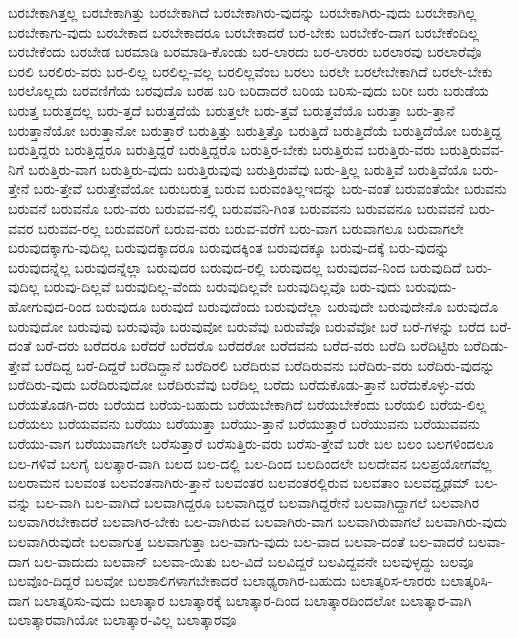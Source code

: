 {ಬರಬೇಕಾಗಿತ್ತಲ್ಲ
ಬರಬೇಕಾಗಿತ್ತು
ಬರಬೇಕಾಗಿದೆ
ಬರಬೇಕಾಗಿರು-ವುದನ್ನು
ಬರಬೇಕಾಗಿರು-ವುದು
ಬರಬೇಕಾಗಿಲ್ಲ
ಬರಬೇಕಾಗು-ವುದು
ಬರಬೇಕಾದ
ಬರಬೇಕಾದರೂ
ಬರಬೇಕಾದರೆ
ಬರ-ಬೇಕು
ಬರಬೇಕೆಂ-ದಾಗ
ಬರಬೇಕೆಂದಿಲ್ಲ
ಬರಬೇಕೆಂದು
ಬರಬೇಡ
ಬರಮಾಡಿ
ಬರಮಾಡಿ-ಕೊಂಡು
ಬರ-ಲಾರದು
ಬರ-ಲಾರರು
ಬರಲಾರವು
ಬರಲಾರೆವೊ
ಬರಲಿ
ಬರಲಿರು-ವರು
ಬರ-ಲಿಲ್ಲ
ಬರಲಿಲ್ಲ-ವಲ್ಲ
ಬರಲಿಲ್ಲವೆಂಬ
ಬರಲು
ಬರಲೇ
ಬರಲೇಬೇಕಾಗಿದೆ
ಬರಲೇ-ಬೇಕು
ಬರಲೊಲ್ಲದು
ಬರವಣಿಗೆಯ
ಬರವುದೊ
ಬರಹ
ಬರಿ
ಬರಿದಾದರೆ
ಬರಿಯ
ಬರಿಸು-ವುದು
ಬರೀ
ಬರು
ಬರುಡೆಯ
ಬರುತ್ತ
ಬರುತ್ತದಲ್ಲ
ಬರು-ತ್ತದೆ
ಬರುತ್ತದೆಯೆ
ಬರುತ್ತಲೇ
ಬರು-ತ್ತವೆ
ಬರುತ್ತವೆಯೊ
ಬರುತ್ತಾ
ಬರು-ತ್ತಾನೆ
ಬರುತ್ತಾನೆಯೋ
ಬರುತ್ತಾನೋ
ಬರುತ್ತಾರೆ
ಬರುತ್ತಿತ್ತು
ಬರುತ್ತಿತ್ತೊ
ಬರುತ್ತಿದೆ
ಬರುತ್ತಿದೆಯೆ
ಬರುತ್ತಿದೆಯೋ
ಬರುತ್ತಿದ್ದ
ಬರುತ್ತಿದ್ದರು
ಬರುತ್ತಿದ್ದರೂ
ಬರುತ್ತಿದ್ದರೆ
ಬರುತ್ತಿದ್ದರೊ
ಬರುತ್ತಿರ-ಬೇಕು
ಬರುತ್ತಿರುವ
ಬರುತ್ತಿರು-ವರು
ಬರುತ್ತಿರುವವ-ನಿಗೆ
ಬರುತ್ತಿರು-ವಾಗ
ಬರುತ್ತಿರು-ವುದು
ಬರುತ್ತಿರುವುವು
ಬರುತ್ತಿರುವೆವು
ಬರು-ತ್ತಿಲ್ಲ
ಬರುತ್ತಿವೆ
ಬರುತ್ತಿವೆಯೊ
ಬರು-ತ್ತೇನೆ
ಬರು-ತ್ತೇವೆ
ಬರುತ್ತೇವೆಯೋ
ಬರುಬರುತ್ತ
ಬರುವ
ಬರುವಂತಿಲ್ಲಇದನ್ನು
ಬರು-ವಂತೆ
ಬರುವಂತೆಯೇ
ಬರುವನು
ಬರುವನೆ
ಬರುವನೊ
ಬರು-ವರು
ಬರುವವ-ನಲ್ಲಿ
ಬರುವವನಿ-ಗಿಂತ
ಬರುವವನು
ಬರುವವನೂ
ಬರುವವನೆ
ಬರು-ವವರ
ಬರುವವ-ರಲ್ಲ
ಬರುವವರಿಗೆ
ಬರುವ-ವರು
ಬರುವ-ವರೆಗೆ
ಬರು-ವಾಗ
ಬರುವಾಗಲೂ
ಬರುವಾಗಲೇ
ಬರುವುದಕ್ಕಾಗು-ವುದಿಲ್ಲ
ಬರುವುದಕ್ಕಾದರೂ
ಬರುವುದಕ್ಕಿಂತ
ಬರುವುದಕ್ಕೂ
ಬರುವು-ದಕ್ಕೆ
ಬರು-ವುದನ್ನು
ಬರುವುದನ್ನೆಲ್ಲ
ಬರುವುದನ್ನೆಲ್ಲಾ
ಬರುವುದರ
ಬರುವುದ-ರಲ್ಲಿ
ಬರುವುದಲ್ಲ
ಬರುವುದವ-ನಿಂದ
ಬರುವುದಿದೆ
ಬರು-ವುದಿಲ್ಲ
ಬರುವು-ದಿಲ್ಲವೆ
ಬರುವುದಿಲ್ಲ-ವೆಂದು
ಬರುವುದಿಲ್ಲವೇ
ಬರುವುದಿಲ್ಲವೊ
ಬರು-ವುದು
ಬರುವುದು-ಹೋಗುವುದ-ರಿಂದ
ಬರುವುದೂ
ಬರುವುದೆ
ಬರುವುದೆಂದು
ಬರುವುದೆಲ್ಲಾ
ಬರುವುದೇ
ಬರುವುದೇನೊ
ಬರುವುದೊ
ಬರುವುದೋ
ಬರುವುವು
ಬರುವುವೊ
ಬರುವುವೋ
ಬರುವೆವು
ಬರುವೆವೊ
ಬರುವೆವೋ
ಬರೆ
ಬರೆ-ಗಳನ್ನು
ಬರೆದ
ಬರೆ-ದಂತೆ
ಬರೆ-ದರು
ಬರೆದರೂ
ಬರೆದರೆ
ಬರೆದರೊ
ಬರೆದರೋ
ಬರೆದವನು
ಬರೆದ-ವರು
ಬರೆದಿ
ಬರೆದಿಟ್ಟಿರು
ಬರೆದಿಡು-ತ್ತೇವೆ
ಬರೆದಿದ್ದ
ಬರೆ-ದಿದ್ದರೆ
ಬರೆದಿದ್ದಾನೆ
ಬರೆದಿರಲಿ
ಬರೆದಿರುವ
ಬರೆದಿರುವನು
ಬರೆದಿರು-ವರು
ಬರೆದಿರು-ವುದನ್ನು
ಬರೆದಿರು-ವುದು
ಬರೆದಿರುವುದೋ
ಬರೆದಿರುವೆವು
ಬರೆದಿಲ್ಲ
ಬರೆದು
ಬರೆದುಕೊಡು-ತ್ತಾನೆ
ಬರೆದುಕೊಳ್ಳು-ವರು
ಬರೆಯತೊಡಗಿ-ದರು
ಬರೆಯದ
ಬರೆಯ-ಬಹುದು
ಬರೆಯಬೇಕಾಗಿದೆ
ಬರೆಯಬೇಕೆಂದು
ಬರೆಯಲಿ
ಬರೆಯ-ಲಿಲ್ಲ
ಬರೆಯಲು
ಬರೆಯವವನು
ಬರೆಯು
ಬರೆಯುತ್ತಾ
ಬರೆಯು-ತ್ತಾನೆ
ಬರೆಯುತ್ತಾರೆ
ಬರೆಯುವನು
ಬರೆಯುವವನು
ಬರೆಯು-ವಾಗ
ಬರೆಯುವಾಗಲೇ
ಬರೆಸುತ್ತಾರೆ
ಬರೆಸುತ್ತಿರು-ವರು
ಬರೆಸು-ತ್ತೇವೆ
ಬರೇ
ಬಲ
ಬಲಂ
ಬಲಗಳಿಂದಲೂ
ಬಲ-ಗಳಿವೆ
ಬಲಗೈ
ಬಲತ್ಕಾರ-ವಾಗಿ
ಬಲದ
ಬಲ-ದಲ್ಲಿ
ಬಲ-ದಿಂದ
ಬಲದಿಂದಲೇ
ಬಲದೇವನ
ಬಲಪ್ರಯೋಗವೆಲ್ಲ
ಬಲರಾಮನ
ಬಲವಂತ
ಬಲವಂತನಾಗಿರು-ತ್ತಾನೆ
ಬಲವಂತರ
ಬಲವಂತರಲ್ಲಿರುವ
ಬಲವತಾಂ
ಬಲವದ್ದೃಢಮ್
ಬಲ-ವನ್ನು
ಬಲ-ವಾಗಿ
ಬಲ-ವಾಗಿದೆ
ಬಲವಾಗಿದ್ದರೂ
ಬಲವಾಗಿದ್ದರೆ
ಬಲವಾಗಿದ್ದರೇನೆ
ಬಲವಾಗಿದ್ದಾಗಲೆ
ಬಲವಾಗಿರ
ಬಲವಾಗಿರಬೇಕಾದರೆ
ಬಲವಾಗಿರ-ಬೇಕು
ಬಲ-ವಾಗಿರುವ
ಬಲವಾಗಿರು-ವಾಗ
ಬಲವಾಗಿರುವಾಗಲೆ
ಬಲವಾಗಿರು-ವುದು
ಬಲವಾಗಿರುವುದೇ
ಬಲವಾಗುತ್ತ
ಬಲವಾಗುತ್ತಾ
ಬಲ-ವಾಗು-ವುದು
ಬಲ-ವಾದ
ಬಲವಾ-ದಂತೆ
ಬಲ-ವಾದರೆ
ಬಲವಾ-ದಾಗ
ಬಲ-ವಾದುದು
ಬಲವಾನ್
ಬಲವಾ-ಯಿತು
ಬಲ-ವಿದೆ
ಬಲವಿದ್ದರೆ
ಬಲವಿದ್ದವನೇ
ಬಲವುಳ್ಳದ್ದು
ಬಲವೂ
ಬಲವೊಂ-ದಿದ್ದರೆ
ಬಲವೋ
ಬಲಶಾಲಿಗಳಾಗಬೇಕಾದರೆ
ಬಲಾಢ್ಯರಾಗಿರ-ಬಹುದು
ಬಲಾತ್ಕರಿಸ-ಲಾರರು
ಬಲಾತ್ಕರಿಸಿ-ದಾಗ
ಬಲಾತ್ಕರಿಸು-ವುದು
ಬಲಾತ್ಕಾರ
ಬಲಾತ್ಕಾರಕ್ಕೆ
ಬಲಾತ್ಕಾರ-ದಿಂದ
ಬಲಾತ್ಕಾರದಿಂದಲೋ
ಬಲಾತ್ಕಾರ-ವಾಗಿ
ಬಲಾತ್ಕಾರವಾಗಿಯೋ
ಬಲಾತ್ಕಾರ-ವಿಲ್ಲ
ಬಲಾತ್ಕಾರವೂ
}
